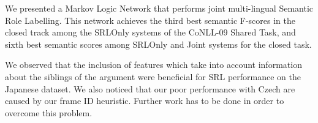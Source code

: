 

We presented a Markov Logic Network that performs joint multi-lingual Semantic 
Role Labelling. This network achieves the third best semantic F-scores in the 
closed track among the SRLOnly systems of the CoNLL-09 Shared Task, and sixth 
best semantic scores among SRLOnly and Joint systems for the closed task.

We observed that the inclusion of features which take into account 
information about the siblings of the argument were beneficial for 
SRL performance on the Japanese dataset. We also noticed that our poor performance with Czech 
are caused by our frame ID heuristic. Further work 
has to be done in order to overcome this problem. 
